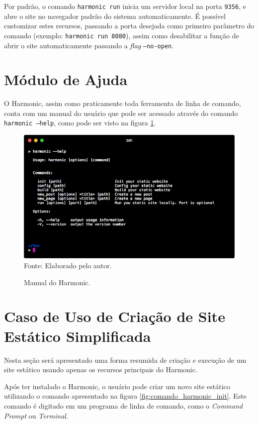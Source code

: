 \documentclass[ppginf, pep]{esinucpel}
\newcommand{\code}[1]{\texttt{#1}}
\begin{document}
Por padrão, o comando \code{harmonic run} inicia um servidor local na porta \code{9356}, e abre o site no navegador padrão do sistema automaticamente. É possível customizar estes recursos, passando a porta desejada como primeiro parâmetro do comando (exemplo: \code{harmonic run 8080}), assim como desabilitar a função de abrir o site automaticamente passando a \textit{flag} \code{--no-open}.

\section{Módulo de Ajuda}

O Harmonic, assim como praticamente toda ferramenta de linha de comando, conta com um manual do usuário que pode ser acessado através do comando \code{harmonic --help}, como pode ser visto na figura \ref{fig:harmonic_help}. %

\begin{figure}[htbp]
    \centering
    \caption{Manual do Harmonic.}
    \vspace{5pt}
    \includegraphics[width=\textwidth]{harmonic_help}
    \\Fonte: Elaborado pelo autor.
    \label{fig:harmonic_help}
\end{figure}

\section{Caso de Uso de Criação de Site Estático Simplificada}

Nesta seção será apresentado uma forma resumida de criação e execução de um site estático usando apenas os recursos principais do Harmonic.

Após ter instalado o Harmonic, o usuário pode criar um novo site estático utilizando o comando apresentado na figura \ref{fig:comando_harmonic_init}. Este comando é digitado em um programa de linha de comando, como o \textit{Command Prompt} ou \textit{Terminal}.
\end{document}
